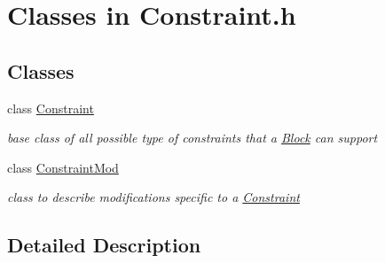 \hypertarget{group___constraint___c_l_a_s_s_e_s}{}\section{Classes in Constraint.\+h}
\label{group___constraint___c_l_a_s_s_e_s}
\subsection*{Classes}
\begin{DoxyCompactItemize}
\item 
class \mbox{\hyperlink{class_s_m_spp__di__unipi__it_1_1_constraint}{Constraint}}
\begin{DoxyCompactList}\small\item\em base class of all possible type of constraints that a \mbox{\hyperlink{class_s_m_spp__di__unipi__it_1_1_block}{Block}} can support \end{DoxyCompactList}\item 
class \mbox{\hyperlink{class_s_m_spp__di__unipi__it_1_1_constraint_mod}{Constraint\+Mod}}
\begin{DoxyCompactList}\small\item\em class to describe modifications specific to a \mbox{\hyperlink{class_s_m_spp__di__unipi__it_1_1_constraint}{Constraint}} \end{DoxyCompactList}\end{DoxyCompactItemize}


\subsection{Detailed Description}
